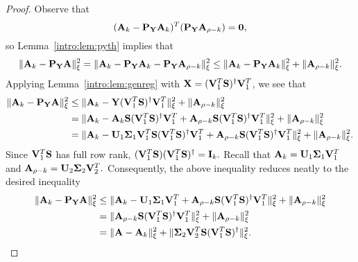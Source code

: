 \begin{proof}
Observe that 
\[
 (\mathbf{A}_k  - \mathbf{P}_{\mathbf{Y}} \mathbf{A}_k)^T (\mathbf{P}_{\mathbf{Y}} \mathbf{A}_{\rho-k}) = \bm{0},
\]
so Lemma~\ref{intro:lem:pyth} implies that 
\[
\mbox{}\|\mathbf{A}_k - \mathbf{P}_{\mathbf{Y}} \mathbf{A}\|_{\xi}^2 = 
\mbox{}\|\mathbf{A}_k  - \mathbf{P}_{\mathbf{Y}} \mathbf{A}_k -\mathbf{P}_{\mathbf{Y}} \mathbf{A}_{\rho-k} \|_{\xi}^2
\le \mbox{}\|\mathbf{A}_k - \mathbf{P}_{\mathbf{Y}} \mathbf{A}_k\|_{\xi}^2 +  \mbox{}\| \mathbf{A}_{\rho-k} \|_{\xi}^2.
\]
Applying Lemma~\ref{intro:lem:genreg}
with $\mathbf{X} = (\mathbf{V}_1^T \mathbf{S})^\dagger \mathbf{V}_1^T$, we see that
\begin{align*}
\mbox{}\|\mathbf{A}_k - \mathbf{P}_{\mathbf{Y}} \mathbf{A}\|_{\xi}^2 & \le 
\mbox{}\|\mathbf{A}_k - \mathbf{Y} (\mathbf{V}_1^T \mathbf{S})^\dagger \mathbf{V}_1^T \|_{\xi}^2
 +  \mbox{}\| \mathbf{A}_{\rho-k} \|_{\xi}^2 \\
 & = \mbox{}\|\mathbf{A}_k - \mathbf{A}_k \mathbf{S} 
     (\mathbf{V}_1^T \mathbf{S})^\dagger \mathbf{V}_1^T   + 
     \mathbf{A}_{\rho-k}\mathbf{S} (\mathbf{V}_1^T \mathbf{S})^\dagger \mathbf{V}_1^T\|_{\xi}^2
     +   \mbox{}\| \mathbf{A}_{\rho-k} \|_{\xi}^2 \\
 & = \mbox{}\|\mathbf{A}_k - \mathbf{U}_1 \mathbf{\Sigma}_1 \mathbf{V}_1^T \mathbf{S} 
     (\mathbf{V}_1^T \mathbf{S})^\dagger \mathbf{V}_1^T   + 
     \mathbf{A}_{\rho-k}\mathbf{S} (\mathbf{V}_1^T \mathbf{S})^\dagger \mathbf{V}_1^T\|_{\xi}^2
     +   \mbox{}\| \mathbf{A}_{\rho-k} \|_{\xi}^2.
\end{align*}
Since $\mathbf{V}_1^T\mathbf{S}$ has full row rank, 
$(\mathbf{V}_1^T \mathbf{S}) (\mathbf{V}_1^T \mathbf{S})^\dagger = \mathbf{I}_{k}.$ 
Recall that $\mathbf{A}_k = \mathbf{U}_1 \mathbf{\Sigma}_1 \mathbf{V}_1^T$ and 
$\mathbf{A}_{\rho -k} = \mathbf{U}_2 \mathbf{\Sigma}_2 \mathbf{V}_2^T.$ 
Consequently, the above inequality reduces neatly to the desired
inequality
\begin{align*}
 \mbox{}\|\mathbf{A}_k - \mathbf{P}_{\mathbf{Y}} \mathbf{A}\|_{\xi}^2 & \le 
 \mbox{}\|\mathbf{A}_k - \mathbf{U}_1 \mathbf{\Sigma}_1 \mathbf{V}_1^T   + 
     \mathbf{A}_{\rho-k}\mathbf{S} (\mathbf{V}_1^T \mathbf{S})^\dagger \mathbf{V}_1^T\|_{\xi}^2
     +   \mbox{}\| \mathbf{A}_{\rho-k} \|_{\xi}^2 \\
     & =
 \mbox{}\|\mathbf{A}_{\rho-k}\mathbf{S} (\mathbf{V}_1^T \mathbf{S})^\dagger \mathbf{V}_1^T\|_{\xi}^2
     +   \mbox{}\| \mathbf{A}_{\rho-k}\|_{\xi}^2 \\
     & = \mbox{}\|\mathbf{A} - \mathbf{A}_k\|_{\xi}^2 + 
      \mbox{}\|\mathbf{\Sigma}_2 \mathbf{V}_2^T \mathbf{S}
      (\mathbf{V}_1^T \mathbf{S})^\dagger\|_{\xi}^2.
\end{align*}
\end{proof}

